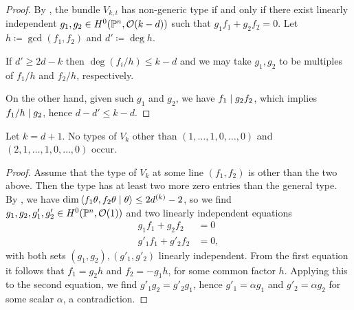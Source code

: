\begin{proof}
	By , the bundle $V_{k,t}$ has non-generic type if and only if there exist linearly independent $g_1,g_2\in H^0(\mathbb{P}^n,\mathcal{O}(k-d))$ such that $g_1f_1+g_2f_2 = 0$. Let $h \coloneqq \gcd(f_1,f_2)$ and $d'\coloneqq \deg h$.

	If $d' \geq 2d-k$ then $\deg (f_i/h) \leq k-d$ and we may take $g_1,g_2$ to be multiples of $f_1/h$ and $f_2/h$, respectively.

	On the other hand, given such $g_1$ and $g_2$, we have $f_1\mid g_2 f_2$, which implies $f_1/h \mid g_2$, hence $d-d'\leq k-d$.
\end{proof}


\begin{proposition} \label{no-big-types-general}
	Let $k=d+1$. No types of $V_k$ other than
	$(1,\dotsc,1,0,\dotsc,0)$ and $(2,1,\dotsc,1,0,\dotsc,0)$ occur. 
\end{proposition}

\begin{proof}
	Assume that the type of $V_k$ at some line $(f_1,f_2)$ is other than the two above. Then the type has at least two more zero entries than the general type. By , we have $\dim \left\langle f_1 \theta, f_2 \theta \mid \theta \right\rangle \leq 2d^{(k)}-2$, so we find $g_1,g_2,g'_1,g'_2\in H^0(\mathbb{P}^n,\mathcal{O}(1))$ and two linearly independent equations
	\begin{align*}
		g_1f_1 + g_2f_2 &= 0 \\
		g'_1 f_1 + g'_2 f_2 &= 0,
	\end{align*}
	with both sets $(g_1,g_2), (g'_1,g'_2)$ linearly independent.
	From the first equation it follows that $f_1 = g_2 h$ and $f_2 = -g_1 h$, for some common factor $h$. Applying this to the second equation, we find $g'_1 g_2 = g'_2 g_1$, hence $g'_1 = \alpha g_1$ and $g'_2 = \alpha g_2$ for some scalar $\alpha$, a contradiction.
\end{proof}


